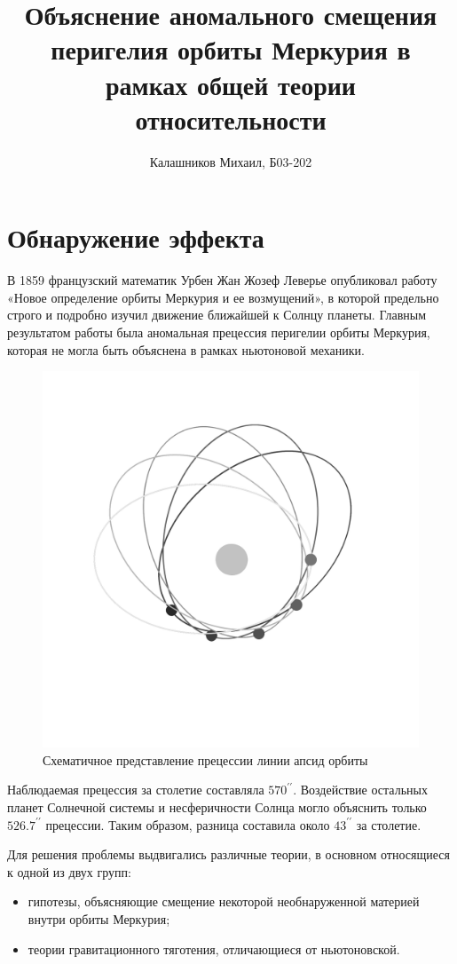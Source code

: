 \documentclass[14pt, a4paper]{report}
\title{\textbf{Объяснение аномального смещения перигелия орбиты Меркурия в рамках общей теории относительности}}
\author{Калашников Михаил, Б03-202}
\date{}
\begin{document}
\maketitle


\section{Обнаружение эффекта}

В 1859 французский математик Урбен Жан Жозеф Леверье опубликовал работу «Новое определение орбиты Меркурия и ее возмущений», в которой предельно строго и подробно изучил движение ближайшей к Солнцу планеты. Главным результатом работы была аномальная прецессия перигелии орбиты Меркурия, которая не могла быть объяснена в рамках ньютоновой механики.

\begin{figure}[H]
\centering
\includegraphics[width=0.6\linewidth]{../images/mc-1}
\caption{Схематичное представление прецессии линии апсид орбиты}
\end{figure}

Наблюдаемая прецессия за столетие составляла $570^{\prime\prime}$. Воздействие остальных планет Солнечной системы и несферичности Солнца могло объяснить только $526.7^{\prime\prime}$ прецессии. Таким образом, разница составила около $43^{\prime\prime}$ за столетие.

Для решения проблемы выдвигались различные теории, в основном относящиеся к одной из двух групп:
\begin{itemize}
\item гипотезы, объясняющие смещение некоторой необнаруженной материей внутри орбиты Меркурия;
\item теории гравитационного тяготения, отличающиеся от ньютоновской.
\end{itemize}
\end{document}
